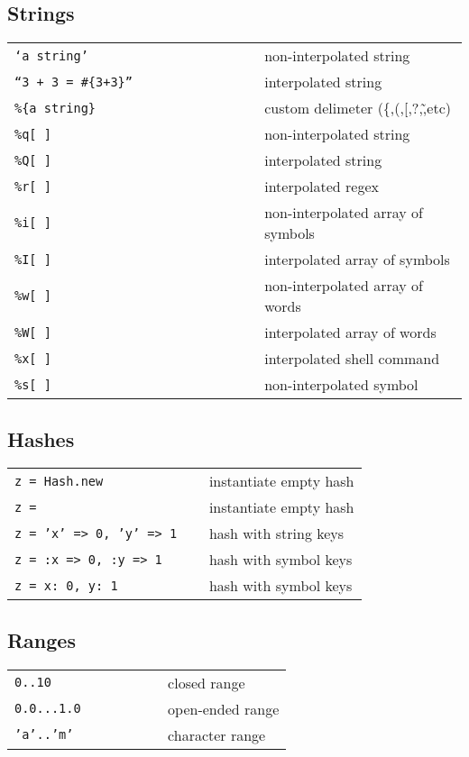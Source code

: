 \documentclass[6pt]{article}
\begin{document}
\begin{multicols}{3}
  \subsection{Strings}
  \begin{tabular}{L{0.55\linewidth} L{0.45\linewidth}}
    \tt `a string'            & non-interpolated string            \\
    \tt ``3 + 3 = \#\{3+3\}'' & interpolated string                \\
    \tt \%\{a string\}        & custom delimeter (\{,(,[,?,\~,etc) \\
    \tt \%q[ ]                & non-interpolated string            \\
    \tt \%Q[ ]                & interpolated string                \\
    \tt \%r[ ]                & interpolated regex                 \\
    \tt \%i[ ]                & non-interpolated array of symbols  \\
    \tt \%I[ ]                & interpolated array of symbols      \\
    \tt \%w[ ]                & non-interpolated array of words    \\
    \tt \%W[ ]                & interpolated array of words        \\
    \tt \%x[ ]                & interpolated shell command         \\
    \tt \%s[ ]                & non-interpolated symbol            \\
  \end{tabular}
  \subsection{Hashes}
  \begin{tabular}{L{0.55\linewidth} L{0.45\linewidth}}
    \tt z = Hash.new             & instantiate empty hash \\
    \tt z = {}                   & instantiate empty hash \\
    \tt z = {'x' => 0, 'y' => 1} & hash with string keys  \\
    \tt z = {:x => 0, :y => 1}   & hash with symbol keys  \\
    \tt z = {x: 0, y: 1}         & hash with symbol keys  \\
  \end{tabular}
  \subsection{Ranges}
  \begin{tabular}{L{0.55\linewidth} L{0.45\linewidth}}
    \tt 0..10     & closed range     \\
    \tt 0.0...1.0 & open-ended range \\
    \tt 'a'..'m'  & character range  \\
  \end{tabular}


\end{multicols}
\end{document}
